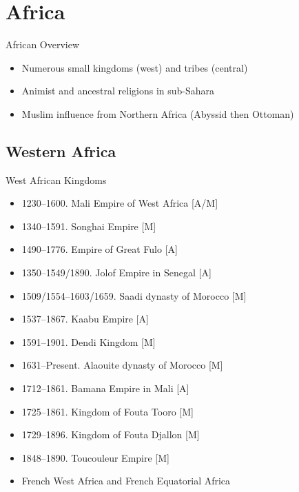 

\section{Africa}
\begin{frame}{African Overview}
	\begin{itemize}
		\item<1,3->Numerous small kingdoms (west) and tribes (central)
		\item<3->Animist and ancestral religions in sub-Sahara
		\item<4->Muslim influence from Northern Africa (Abyssid then Ottoman)
	\end{itemize}
\end{frame}

\subsection{Western Africa}
\begin{frame}{West African Kingdoms}
	\begin{itemize}
		\item<1-7,9->1230--1600. Mali Empire of West Africa [A/M]
		\item<2-7,9->1340--1591. Songhai Empire [M]
		\item<3-7,9->1490--1776. Empire of Great Fulo [A]
		\item<4-7,9->1350--1549/1890. Jolof Empire in Senegal [A]
		\item<5-7,9->1509/1554--1603/1659. Saadi dynasty of Morocco [M]
		\item<6-7,9->1537--1867. Kaabu Empire [A]
		\item<7,9->1591--1901. Dendi Kingdom [M]
		\item<9->1631--Present. Alaouite dynasty of Morocco [M]
		\item<10->1712--1861. Bamana Empire in Mali [A]
		\item<11->1725--1861. Kingdom of Fouta Tooro [M]
		\item<12->1729--1896. Kingdom of Fouta Djallon [M]
		\item<13->1848--1890. Toucouleur Empire [M]
		\item<14->French West Africa and French Equatorial Africa
	\end{itemize}
\end{frame}

